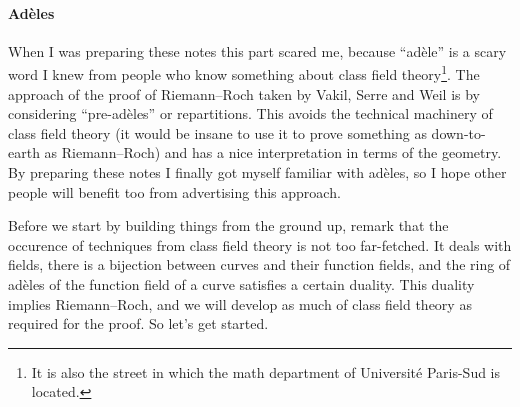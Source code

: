 \documentclass[10pt,a4paper]{article}
\theoremstyle{lecture}
\begin{document}
\paragraph{Ad\`eles}
When I was preparing these notes this part scared me, because ``ad\`ele'' is a scary word I knew from people who know something about class field theory\footnote{It is also the street in which the math department of Universit\'e Paris-Sud is located.}. The approach of the proof of Riemann--Roch taken by Vakil, Serre and Weil is by considering ``pre-ad\`eles'' or repartitions. This avoids the technical machinery of class field theory (it would be insane to use it to prove something as down-to-earth as Riemann--Roch) and has a nice interpretation in terms of the geometry. By preparing these notes I finally got myself familiar with ad\`eles, so I hope other people will benefit too from advertising this approach.

Before we start by building things from the ground up, remark that the occurence of techniques from class field theory is not too far-fetched. It deals with fields, there is a bijection between curves and their function fields\addreference, and the ring of ad\`eles of the function field of a curve satisfies a certain duality\addreference. This duality implies Riemann--Roch, and we will develop as much of class field theory as required for the proof. So let's get started.
\end{document}
